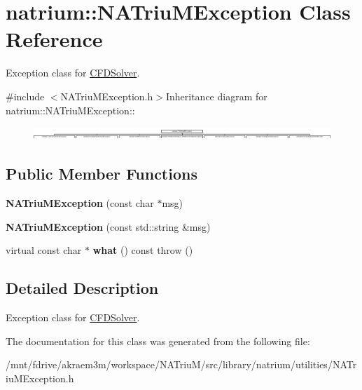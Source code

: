\hypertarget{classnatrium_1_1NATriuMException}{
\section{natrium::NATriuMException Class Reference}
\label{classnatrium_1_1NATriuMException}
}


Exception class for \hyperlink{classnatrium_1_1CFDSolver}{CFDSolver}.  


{\ttfamily \#include $<$NATriuMException.h$>$}Inheritance diagram for natrium::NATriuMException::\begin{figure}[H]
\begin{center}
\leavevmode
\includegraphics[height=0.481928cm]{classnatrium_1_1NATriuMException}
\end{center}
\end{figure}
\subsection*{Public Member Functions}
\begin{DoxyCompactItemize}
\item 
\hypertarget{classnatrium_1_1NATriuMException_aadad1a8a8839c17b06fdbf8a7193a034}{
{\bfseries NATriuMException} (const char $\ast$msg)}
\label{classnatrium_1_1NATriuMException_aadad1a8a8839c17b06fdbf8a7193a034}

\item 
\hypertarget{classnatrium_1_1NATriuMException_a0616fc08feadba7260bab159cf042dc4}{
{\bfseries NATriuMException} (const std::string \&msg)}
\label{classnatrium_1_1NATriuMException_a0616fc08feadba7260bab159cf042dc4}

\item 
\hypertarget{classnatrium_1_1NATriuMException_ac44c7c02643b890807daf146d86aa514}{
virtual const char $\ast$ {\bfseries what} () const   throw ()}
\label{classnatrium_1_1NATriuMException_ac44c7c02643b890807daf146d86aa514}

\end{DoxyCompactItemize}


\subsection{Detailed Description}
Exception class for \hyperlink{classnatrium_1_1CFDSolver}{CFDSolver}. 

The documentation for this class was generated from the following file:\begin{DoxyCompactItemize}
\item 
/mnt/fdrive/akraem3m/workspace/NATriuM/src/library/natrium/utilities/NATriuMException.h\end{DoxyCompactItemize}

